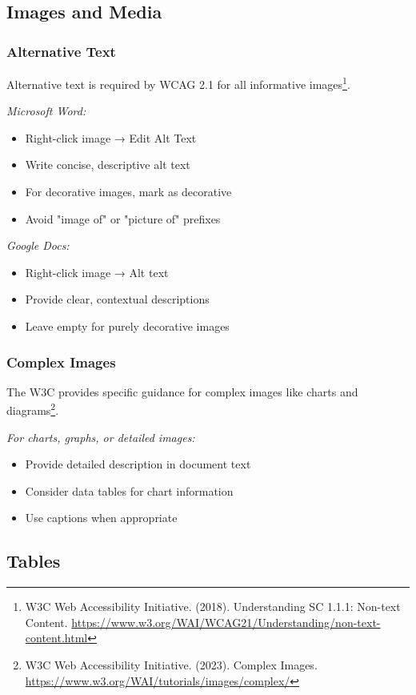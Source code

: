 \subsection{Images and Media}

\subsubsection{Alternative Text}
Alternative text is required by WCAG 2.1 for all informative images\footnote{W3C Web Accessibility Initiative. (2018). Understanding SC 1.1.1: Non-text Content. \url{https://www.w3.org/WAI/WCAG21/Understanding/non-text-content.html}}.

\emph{Microsoft Word:}
\begin{itemize}
\item Right-click image → Edit Alt Text
\item Write concise, descriptive alt text
\item For decorative images, mark as decorative
\item Avoid "image of" or "picture of" prefixes
\end{itemize}

\emph{Google Docs:}
\begin{itemize}
\item Right-click image → Alt text
\item Provide clear, contextual descriptions
\item Leave empty for purely decorative images
\end{itemize}

\subsubsection{Complex Images}
The W3C provides specific guidance for complex images like charts and diagrams\footnote{W3C Web Accessibility Initiative. (2023). Complex Images. \url{https://www.w3.org/WAI/tutorials/images/complex/}}.

\emph{For charts, graphs, or detailed images:}
\begin{itemize}
\item Provide detailed description in document text
\item Consider data tables for chart information
\item Use captions when appropriate
\end{itemize}

\subsection{Tables}

